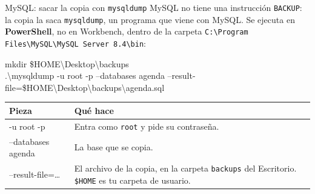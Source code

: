 \documentclass[aspectratio=169,10pt,c]{beamer}
\newenvironment{sqlmicro}[1][.86\textwidth]
  {\begin{center}\begin{lrbox}{\sqlbuf}\begin{minipage}{#1}\ttfamily\fontsize{6.4}{7.5}\selectfont\vspace{4pt}\raggedright}
  {\vspace{4pt}\end{minipage}\end{lrbox}\colorbox{utpGrisClaro}{\usebox{\sqlbuf}}\end{center}}
\begin{document}
\begin{frame}{MySQL: sacar la copia con \texttt{mysqldump}}
\small MySQL no tiene una instrucción \texttt{BACKUP}: la copia la saca \texttt{mysqldump}, un programa que viene con MySQL. Se ejecuta en \textbf{PowerShell}, no en Workbench, dentro de la carpeta \texttt{C:\textbackslash Program Files\textbackslash MySQL\textbackslash MySQL Server 8.4\textbackslash bin}:
\vspace{0.15cm}
\begin{sqlmicro}[\textwidth]
mkdir \$HOME\textbackslash Desktop\textbackslash backups\\
.\textbackslash mysqldump -u root -p --databases agenda --result-file=\$HOME\textbackslash Desktop\textbackslash backups\textbackslash agenda.sql
\end{sqlmicro}
\vspace{0.05cm}
\begin{center}
\footnotesize
\renewcommand{\arraystretch}{1.15}
\begin{tabular}{@{}>{\ttfamily}l>{\raggedright\arraybackslash}p{6.6cm}@{}}
\toprule
\normalfont\bfseries Pieza & \bfseries Qué hace \\
\midrule
-u root -p & Entra como \texttt{root} y pide su contraseña. \\
--databases agenda & La base que se copia. \\
--result-file=\ldots & El archivo de la copia, en la carpeta \texttt{backups} del Escritorio. \texttt{\$HOME} es tu carpeta de usuario. \\
\bottomrule
\end{tabular}
\end{center}
\vspace{0.1cm}
\end{frame}
\end{document}
